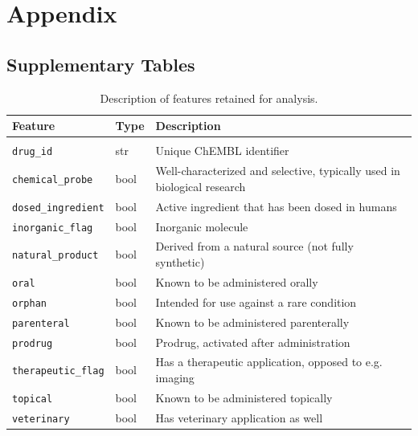 \appendix
\renewcommand{\thefigure}{A\arabic{figure}}  
\renewcommand{\thetable}{A\arabic{table}}   
\renewcommand{\thealgorithm}{A\arabic{algorithm}} 
\setcounter{figure}{0}
\setcounter{table}{0}
\setcounter{algorithm}{0}
\section{Appendix}

\subsection{Supplementary Tables}
\begin{table}[H]
    \centering
    \footnotesize
    \caption{Description of features retained for analysis.}
    \label{tab:feature_description}
    \begin{tabular}{p{4cm}p{2cm}p{9cm}}
       \toprule
        \textbf{Feature} & \textbf{Type}& \textbf{Description} \\
        \midrule
        \rowcolor{white}
        \multicolumn{2}{l}{\textbf{Drug}} \\
        \midrule
        \texttt{drug\_id}& str & Unique ChEMBL identifier\\
        \texttt{chemical\_probe} & bool & Well-characterized and selective, typically used in biological research\\
        \texttt{dosed\_ingredient} & bool & Active ingredient that has been dosed in humans \\
        \texttt{inorganic\_flag} & bool & Inorganic molecule \\
        \texttt{natural\_product} & bool & Derived from a natural source (not fully synthetic)\\
        \texttt{oral} & bool & Known to be administered orally\\
        \texttt{orphan} & bool & Intended for use against a rare condition\\
        \texttt{parenteral} & bool & Known to be administered parenterally\\
        \texttt{prodrug} & bool & Prodrug, activated after administration\\
        \texttt{therapeutic\_flag} & bool & Has a therapeutic application, opposed to e.g. imaging\\
        \texttt{topical} & bool & Known to be administered topically\\
        \texttt{veterinary} & bool & Has veterinary application as well\\

\end{tabular}
\end{table}
